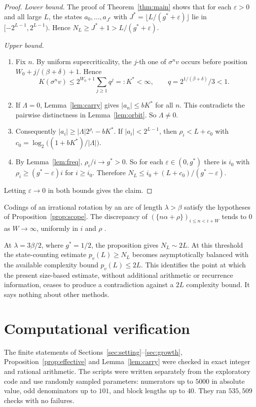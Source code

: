 \documentclass[11pt]{amsart}
\theoremstyle{definition}
\theoremstyle{remark}
\newcommand{\gs}{g^{*}}
\begin{document}
\begin{proof}
\emph{Lower bound.} The proof of Theorem~\ref{thm:main} shows that for each $\varepsilon>0$ and all large $L$, the states $a_0,\dots,a_{J^*}$ with $J^*=\lfloor L/(\gs+\varepsilon)\rfloor$ lie in $[-2^{L-1},2^{L-1})$. Hence $N_L\ge J^*+1>L/(\gs+\varepsilon)$.

\emph{Upper bound.}
\begin{enumerate}[leftmargin=2em]
\item Fix $n$. By uniform supercriticality, the $j$-th one of $\sigma^n v$ occurs before position $W_0+j/(\beta+\delta)+1$. Hence
\[
K(\sigma^n v)\le 2^{W_0+1}\sum_{j\ge1}q^j=:K^*<\infty,\qquad q=2^{1/(\beta+\delta)}/3<1 .
\]
\item If $\Lambda=0$, Lemma~\ref{lem:carry} gives $|a_n|\le bK^*$ for all $n$. This contradicts the pairwise distinctness in Lemma~\ref{lem:orbit}. So $\Lambda\neq0$.
\item Consequently $|a_i|\ge|\Lambda|2^{\rho_i}-bK^*$. If $|a_i|<2^{L-1}$, then $\rho_i<L+c_0$ with $c_0=\log_2\bigl((1+bK^*)/|\Lambda|\bigr)$.
\item By Lemma~\ref{lem:freq}, $\rho_i/i\to\gs>0$. So for each $\varepsilon\in(0,\gs)$ there is $i_0$ with $\rho_i\ge(\gs-\varepsilon)i$ for $i\ge i_0$. Therefore $N_L\le i_0+(L+c_0)/(\gs-\varepsilon)$.
\end{enumerate}
Letting $\varepsilon\to0$ in both bounds gives the claim.
\end{proof}

Codings of an irrational rotation by an arc of length $\lambda>\beta$ satisfy the hypotheses of Proposition~\ref{prop:scope}. The discrepancy of $(\{n\alpha+\rho\})_{i\le n<i+W}$ tends to $0$ as $W\to\infty$, uniformly in $i$ and $\rho$ \cite{KN74}.

At $\lambda=3\beta/2$, where $\gs=1/2$, the proposition gives $N_L\sim 2L$. At this threshold the state-counting estimate $p_v(L)\ge N_L$ becomes asymptotically balanced with the available complexity bound $p_v(L)\le2L$. This identifies the point at which the present size-based estimate, without additional arithmetic or recurrence information, ceases to produce a contradiction against a $2L$ complexity bound. It says nothing about other methods.

\section{Computational verification}\label{sec:computation}

The finite statements of Sections~\ref{sec:setting}--\ref{sec:growth}, Proposition~\ref{prop:effective} and Lemma~\ref{lem:carry} were checked in exact integer and rational arithmetic. The scripts were written separately from the exploratory code and use randomly sampled parameters: numerators up to $5000$ in absolute value, odd denominators up to $101$, and block lengths up to $40$. They ran $535{,}509$ checks with no failures.
\end{document}
